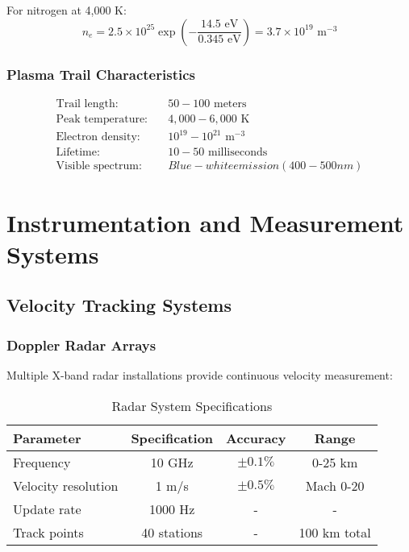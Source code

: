 \documentclass[12pt,a4paper]{article}
\begin{document}
For nitrogen at 4,000 K:
\begin{equation}
n_e = 2.5 \times 10^{25} \exp\left(-\frac{14.5 \text{ eV}}{0.345 \text{ eV}}\right) = 3.7 \times 10^{19} \text{ m}^{-3}
\label{eq:nitrogen_ionization}
\end{equation}

\subsubsection{Plasma Trail Characteristics}
\begin{align}
\text{Trail length:} &\quad 50-100 \text{ meters} \\
\text{Peak temperature:} &\quad 4,000-6,000 \text{ K} \\
\text{Electron density:} &\quad 10^{19}-10^{21} \text{ m}^{-3} \\
\text{Lifetime:} &\quad 10-50 \text{ milliseconds} \\
\text{Visible spectrum:} &\quad Blue-white emission (400-500 nm)
\end{align}

\section{Instrumentation and Measurement Systems}

\subsection{Velocity Tracking Systems}

\subsubsection{Doppler Radar Arrays}
Multiple X-band radar installations provide continuous velocity measurement:

\begin{table}[H]
\centering
\caption{Radar System Specifications}
\label{tab:radar_specs}
\begin{tabular}{lccc}
\toprule
Parameter & Specification & Accuracy & Range \\
\midrule
Frequency & 10 GHz & $\pm 0.1\%$ & 0-25 km \\
Velocity resolution & 1 m/s & $\pm 0.5\%$ & Mach 0-20 \\
Update rate & 1000 Hz & - & - \\
Track points & 40 stations & - & 100 km total \\
\bottomrule
\end{tabular}
\end{table}
\end{document}
